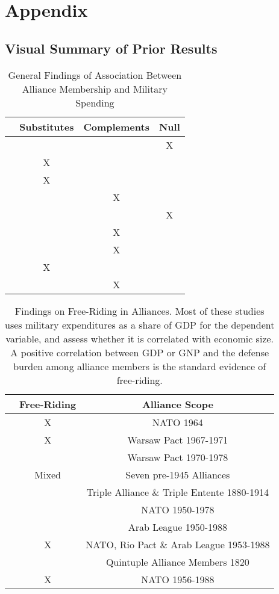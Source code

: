 \documentclass[12pt]{article}
\begin{document}
\section*{Appendix}

\subsection*{Visual Summary of Prior Results} 


\begin{table}[hbt!]
\begin{tabular}{lccc}
     & Substitutes & Complements & Null \\
\hline
\citet{MostSiverson1987} &  &  & X \\
\citet{Morrow1993} & X &  &  \\ 
\citet{Conybeare1994} & X & &  \\
\citet{Diehl1994} &  & X &  \\
\citet{Goldsmith2003} &  &  & X \\
\citet{MorganPalmer2006} &  & X & \\ 
\citet{QuirozFlores2011} &  & X &  \\ 
\citet{DigiuseppePoast2016} & X & & \\ 
\citet{Horowitzetal2017} &  & X & \\ 
\hline
\end{tabular}
\caption{General Findings of Association Between Alliance Membership and Military Spending}
\end{table}


\begin{table}[hbt!]
\begin{tabular}{lcc}
  & Free-Riding & Alliance Scope \\
\hline
\citet{OlsonZeckhauser1966} & X  & NATO 1964 \\
\citet{Starr1974} & X & Warsaw Pact 1967-1971 \\
\citet{Reisinger1983} &  & Warsaw Pact 1970-1978 \\
\citet{Thies1987} & Mixed & Seven pre-1945 Alliances \\ 
\citet{ConybeareSandler1990} &  & Triple Alliance \& Triple Entente 1880-1914 \\
\citet{Palmer1990} &   & NATO 1950-1978 \\
\citet{Chenetal1996} &  & Arab League 1950-1988 \\
\citet{OnealWhatley1996} & X & NATO, Rio Pact \& Arab League 1953-1988 \\
\citet{Siroky2012} &  & Quintuple Alliance Members 1820 \\
\citet{PluemperNeumayer2015} & X & NATO 1956-1988 \\
\hline 
\end{tabular}
\caption{Findings on Free-Riding in Alliances. Most of these studies uses military expenditures as a share of GDP for the dependent variable, and assess whether it is correlated with economic size. A positive correlation between GDP or GNP and the defense burden among alliance members is the standard evidence of free-riding.}
\end{table}






  
% 
\end{document}
